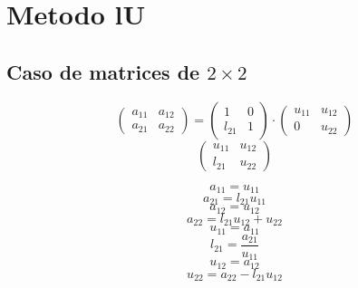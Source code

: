 \documentclass[10pt,a4paper,dvipdfmx]{article}
\begin{document}
\section{Metodo lU}
\subsection{Caso de matrices de $2\times 2$ }
$$ \left( 
\begin{array}{cc}
a_{{1}{1}} & a_{{1}{2}} \\
a_{{2}{1}} & a_{{2}{2}} 
 \end{array}
\right)
 = \left( 
\begin{array}{cc}
1 & 0 \\
l_{{2}{1}} & 1 
 \end{array}
\right)
 \cdot \left( 
\begin{array}{cc}
u_{{1}{1}} & u_{{1}{2}} \\
0 & u_{{2}{2}} 
 \end{array}
\right)
 $$
$$ \left( 
\begin{array}{cc}
u_{{1}{1}} & u_{{1}{2}} \\
l_{{2}{1}} & u_{{2}{2}} 
 \end{array}
\right)
 $$
\begin{multicols}{2}
$$ a_{{1}{1}} = u_{{1}{1}} $$
$$ a_{{2}{1}} = l_{{2}{1}} u_{{1}{1}} $$
$$ a_{{1}{2}} = u_{{1}{2}} $$
$$ a_{{2}{2}} = l_{{2}{1}} u_{{1}{2}} + u_{{2}{2}} $$
\vfill\null
\columnbreak
$$ u_{{1}{1}} = a_{{1}{1}} $$
$$ l_{{2}{1}} = \dfrac{a_{{2}{1}}}{u_{{1}{1}}} $$
$$ u_{{1}{2}} = a_{{1}{2}} $$
$$ u_{{2}{2}} = a_{{2}{2}}- l_{{2}{1}} u_{{1}{2}} $$
\end{multicols}
\end{document}
